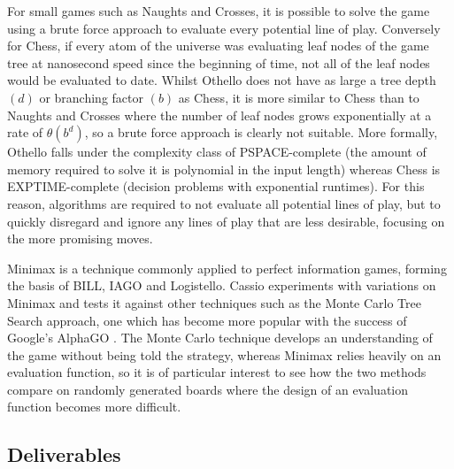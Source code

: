\documentclass[12pt,a4paper]{article}
\begin{document}
For small games such as Naughts and Crosses, it is possible to solve the game using a brute force approach to evaluate every potential line of play. Conversely for Chess, if every atom of the universe was evaluating leaf nodes of the game tree at nanosecond speed since the beginning of time, not all of the leaf nodes would be evaluated to date. Whilst Othello does not have as large a tree depth $(d)$ or branching factor $(b)$ as Chess, it is more similar to Chess than to Naughts and Crosses where the number of leaf nodes grows exponentially at a rate of $\theta(b^d)$, so a brute force approach is clearly not suitable. More formally, Othello falls under the complexity class of PSPACE-complete (the amount of memory required to solve it is polynomial in the input length) whereas Chess is EXPTIME-complete (decision problems with exponential runtimes). For this reason, algorithms are required to not evaluate all potential lines of play, but to quickly disregard and ignore any lines of play that are less desirable, focusing on the more promising moves.

Minimax is a technique commonly applied to perfect information games, forming the basis of BILL, IAGO and Logistello. Cassio experiments with variations on Minimax and tests it against other techniques such as the Monte Carlo Tree Search approach, one which has become more popular with the success of Google's AlphaGO \cite{lee2016human}. The Monte Carlo technique develops an understanding of the game without being told the strategy, whereas Minimax relies heavily on an evaluation function, so it is of particular interest to see how the two methods compare on randomly generated boards where the design of an evaluation function becomes more difficult. 



\subsection{Deliverables}
\end{document}
